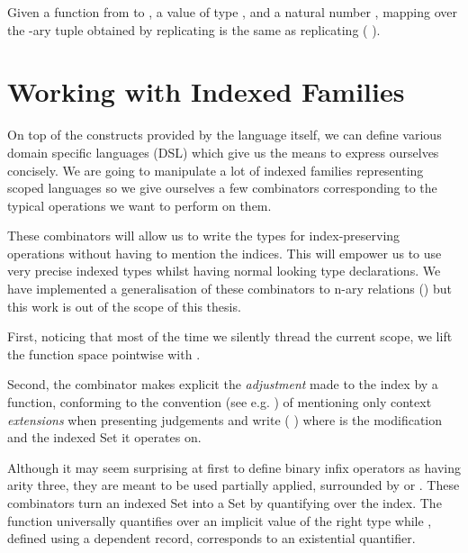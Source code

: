 \begin{lemma}
Given a function  from  to , a value  of type ,
and a natural number , mapping  over the -ary tuple obtained
by replicating  is the same as replicating ( ).
\end{lemma}




\section{Working with Indexed Families}
\label{sec:indexed-combinators}

On top of the constructs provided by the language itself, we can define various
domain specific languages (DSL) which give us the means to express ourselves
concisely. We are going to manipulate a lot of indexed families representing
scoped languages so we give ourselves a few combinators corresponding to the
typical operations we want to perform on them.

These combinators will allow us to write the types for index-preserving
operations without having to mention the indices. This will empower us
to use very precise indexed types whilst having normal looking type
declarations. We have implemented a generalisation of these combinators
to n-ary relations (\cite{DBLP:conf/icfp/Allais19}) but this work is out
of the scope of this thesis.



First, noticing that most of the time we silently thread the current scope, we lift
the function space pointwise with .


Second, the  combinator makes explicit the \emph{adjustment} made to the
index by a function, conforming to the convention (see e.g. \cite{martin1982constructive})
of mentioning only context \emph{extensions} when presenting judgements and write
({  }) where  is the modification and  the indexed
Set it operates on.


Although it may seem surprising at first to define binary infix operators as having
arity three, they are meant to be used partially applied, surrounded by 
or . These combinators turn an indexed Set into a Set by quantifying over
the index. The function  universally quantifies over an implicit value
of the right type while , defined using a dependent record, corresponds
to an existential quantifier.

